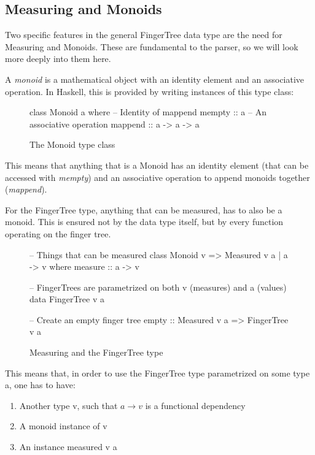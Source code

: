 \documentclass[a4paper,12pt,twosided]{report}
\begin{document}
\subsection{Measuring and Monoids}
Two specific features in the general FingerTree data type are the need for
Measuring and Monoids. These are fundamental to the parser, so we will look more
deeply into them here.

A \textit{monoid} is a mathematical object with an identity element and an
associative operation. In Haskell, this is provided by writing instances of this
type class:
\begin{figure}[H]
\begin{code}
class Monoid a where
    -- Identity of mappend
    mempty  :: a
    -- An associative operation
    mappend :: a -> a -> a
\end{code}
\caption{The Monoid type class}
\end{figure}
This means that anything that is a Monoid has an identity element (that can be
accessed with \textit{mempty}) and an associative operation to append monoids
together (\textit{mappend}).

For the FingerTree type, anything that can be measured, has to also be a monoid.
This is ensured not by the data type itself, but by every function operating on
the finger tree. 
\begin{figure}[H]
\begin{code}
-- Things that can be measured
class Monoid v => Measured v a | a -> v where
    measure :: a -> v

-- FingerTrees are parametrized on both v (measures) and a (values)
data FingerTree v a

-- Create an empty finger tree
empty :: Measured v a => FingerTree v a
\end{code}
\caption{Measuring and the FingerTree type}
\end{figure}

This means that, in order to use the FingerTree type parametrized on some type
a, one has to have:
\begin{enumerate}
    \item{Another type v, such that $a \rightarrow v$ is a functional dependency}
    \item{A monoid instance of v}
    \item{An instance measured v a}
\end{enumerate}
\end{document}
